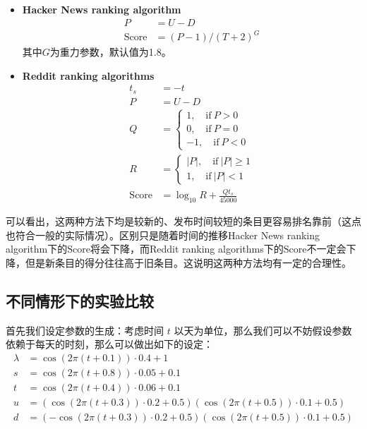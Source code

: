 \documentclass[UTF8]{ctexart}
\theoremstyle{plain}
\theoremstyle{definition}
\theoremstyle{remark}
\begin{document}
    \begin{itemize}
        \item \textbf{Hacker News ranking algorithm}\cite{salihefendic2010hacker}
        \begin{equation}
        \begin{aligned}
        P & = U - D \\
	    \mathrm{Score} & = (P - 1)/(T + 2)^G
        \end{aligned}
	    \end{equation}
        其中$G$为重力参数，默认值为1.8。
        \item \textbf{Reddit ranking algorithms}\cite{salihefendic2010reddit}
        \begin{equation}
        \begin{aligned}
        t_{s} & = -t \\
        P & = U - D \\
        Q & = \begin{cases}
                1, \quad \mathrm{if} \ P > 0 \\
                0, \quad \mathrm{if} \ P = 0 \\
                -1, \quad \mathrm{if} \ P < 0
            \end{cases} \\
        R & = \begin{cases}
            |P|, \quad \mathrm{if} \ |P| \geq 1 \\
            1, \quad \mathrm{if} \ |P| < 1
            \end{cases} \\
        \mathrm{Score} & =  \log_{10} R + \frac{Qt_s}{45000}
        \end{aligned}
	    \end{equation}
    \end{itemize}
    可以看出，这两种方法下均是较新的、发布时间较短的条目更容易排名靠前（这点也符合一般的实际情况）。区别只是随着时间的推移Hacker News ranking algorithm下的$\mathrm{Score}$将会下降，而Reddit ranking algorithms下的$\mathrm{Score}$不一定会下降，但是新条目的得分往往高于旧条目。这说明这两种方法均有一定的合理性。

	\subsection{不同情形下的实验比较}
	首先我们设定参数的生成：考虑时间 $t$ 以天为单位，那么我们可以不妨假设参数依赖于每天的时刻，那么可以做出如下的设定：
	\begin{align}
		\lambda &= \cos(2\pi(t+0.1)) \cdot 0.4 + 1 \\
		s &= \cos(2\pi(t+0.8)) \cdot 0.05 + 0.1 \\
		t &= \cos(2\pi(t+0.4))\cdot 0.06 + 0.1 \\
		u &= (\cos(2\pi(t+0.3)) \cdot 0.2 + 0.5)(\cos(2\pi(t+0.5))\cdot 0.1 + 0.5) \\
		d &= (-\cos(2\pi(t+0.3)) \cdot 0.2 + 0.5)(\cos(2\pi(t+0.5))\cdot 0.1 + 0.5)
	\end{align}
	
\end{document}
